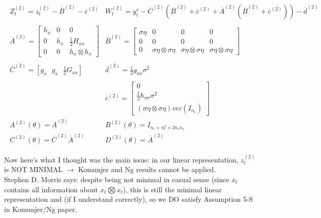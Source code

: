 \documentclass[10pt]{article}
\numberwithin{equation}{section}
\theoremstyle{definition}
\theoremstyle{remark}
\begin{document}
\begin{eqnarray*}\displaystyle
	\begin{array}{ll}
		Z_{t}^{(2)} = z_t^{(2)}-\overline{B}^{(2)}-\overline{c}^{(2)} & W_t^{(2)} = y^s_t - \overline{C}^{(2)}(\overline{B}^{(2)}+\overline{c}^{(2)} + \overline{A}^{(2)}(\overline{B}^{(2)}+\overline{c}^{(2)}))	- \overline{d}^{(2)}\\
		\\
\overline{A}^{(2)} = \left[ \begin{array}{ccc}
h_x & 0 & 0 \\
0 & h_x & \frac{1}{2}H_{xx} \\
0 & 0 & h_x \otimes h_x \end{array} \right] & \overline{B}^{(2)} = \left[ \begin{array}{cccc}
\sigma \eta & 0 & 0 & 0 \\
0 & 0 & 0 & 0 \\
0 & \sigma \eta \otimes \sigma \eta & \sigma \eta \otimes \sigma \eta & \sigma \eta \otimes \sigma \eta \end{array} \right]\\
\\
\overline{C}^{(2)} = [g_x \text{ }g_x \text{ }\frac{1}{2}G_{xx}] & \overline{d}^{(2)} = \frac{1}{2}g_{\sigma \sigma}\sigma^2\\
\\

& \overline{c}^{(2)} = \left[ \begin{array}{c} 0\\ \frac{1}{2}h_{\sigma \sigma}\sigma^2 \\ (\sigma \eta \otimes \sigma \eta )vec(I_{n_\epsilon}) \end{array} \right]\\
A^{(2)}(\theta ) = \overline{A}^{(2)} & B^{(2)}(\theta ) = I_{n_\epsilon + n_\epsilon^2 + 2n_\epsilon n_x}\\
C^{(2)}(\theta ) = \overline{C}^{(2)}\overline{A}^{(2)} & D^{(2)}(\theta )= \overline{A}^{(2)}
\end{array}
\end{eqnarray*}

Now here's what I thought was the main issue: in our linear representation, $z_t^{(2)}$ is NOT MINIMAL $\rightarrow$ Komunjer and Ng results cannot be applied.\\  

Stephen D. Morris says: despite being not minimal in casual sense (since $x_t$ contains all information about $x_t \bigotimes x_t$), this is still the minimal linear representation and (if I understand correctly), so we DO satisfy Assumption 5-S in Komunjer/Ng paper.\\
\end{document}

